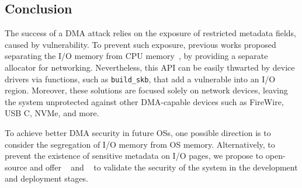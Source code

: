 \subsection{Conclusion}\label{sec:Conclusion}




The success of a DMA attack relies on the exposure of restricted metadata fields, caused by \subpage{} vulnerability. 
To prevent such exposure, previous works proposed separating the I/O memory from CPU memory~\cite{MSMT18}, by providing a separate allocator for networking. 
Nevertheless, this API can be easily thwarted by device drivers via functions, such as \texttt{build\_skb}, that add a vulnerable \shinfo into an I/O region. 
Moreover, these solutions are focused solely on network devices, leaving the system unprotected against other DMA-capable devices such as FireWire, USB C, NVMe, and more.


To achieve better DMA security in future OSs, one possible direction is to consider the segregation of I/O memory from OS memory. 
Alternatively, to prevent the existence of sensitive metadata on I/O pages, we propose to open-source and offer \tool{}~\cite{SPADE} and \dkasan{}~\cite{DKASAN} to validate the security of the system in the development and deployment stages. 



 




